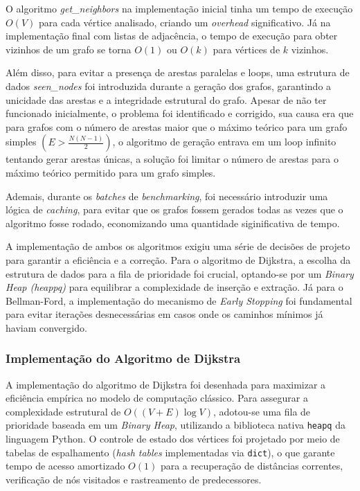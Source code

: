 \documentclass[10pt,a4paper]{article}
\begin{document}
O algoritmo \textit{get\_neighbors} na implementação inicial tinha um tempo de execução $O(V)$ para cada vértice analisado, criando um \textit{overhead} significativo. Já na implementação final com listas de adjacência, o tempo de execução para obter vizinhos de um grafo se torna $O(1)$ ou $O(k)$ para vértices de $k$ vizinhos.

Além disso, para evitar a presença de arestas paralelas e loops, uma estrutura de dados \textit{seen\_nodes} foi introduzida durante a geração dos grafos, garantindo a unicidade das arestas e a integridade estrutural do grafo. Apesar de não ter funcionado inicialmente, o problema foi identificado e corrigido, sua causa era que para grafos com o número de arestas maior que o máximo teórico para um grafo simples $(E > \frac{N(N-1)}{2})$, o algoritmo de geração entrava em um loop infinito tentando gerar arestas únicas, a solução foi limitar o número de arestas para o máximo teórico permitido para um grafo simples.

Ademais, durante os \textit{batches} de \textit{benchmarking}, foi necessário introduzir uma lógica de \textit{caching}, para evitar que os grafos fossem gerados todas as vezes que o algoritmo fosse rodado, economizando uma quantidade siginificativa de tempo.

A implementação de ambos os algoritmos exigiu uma série de decisões de projeto para garantir a eficiência e a correção. Para o algoritmo de Dijkstra, a escolha da estrutura de dados para a fila de prioridade foi crucial, optando-se por um \textit{Binary Heap (heappq)} para equilibrar a complexidade de inserção e extração. Já para o Bellman-Ford, a implementação do mecanismo de \textit{Early Stopping} foi fundamental para evitar iterações desnecessárias em casos onde os caminhos mínimos já haviam convergido.

\subsubsection{Implementação do Algoritmo de Dijkstra}

A implementação do algoritmo de Dijkstra foi desenhada para maximizar a eficiência empírica no modelo de computação clássico. Para assegurar a complexidade estrutural de $O((V + E) \log V)$, adotou-se uma fila de prioridade baseada em um \textit{Binary Heap}, utilizando a biblioteca nativa \texttt{heapq} da linguagem Python. O controle de estado dos vértices foi projetado por meio de tabelas de espalhamento (\textit{hash tables} implementadas via \texttt{dict}), o que garante tempo de acesso amortizado $O(1)$ para a recuperação de distâncias correntes, verificação de nós visitados e rastreamento de predecessores.
\end{document}
